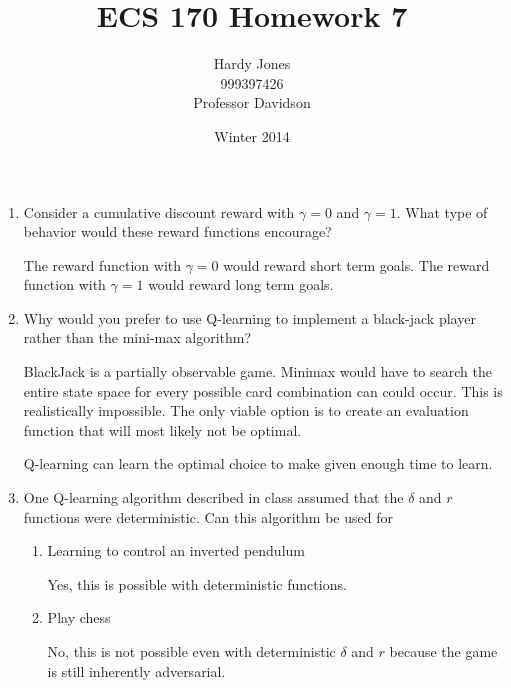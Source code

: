 \documentclass[12pt,letterpaper]{article}
\title{ECS 170 Homework 7\vspace{-2ex}}
\author{Hardy Jones\\
        999397426\\
        Professor Davidson\vspace{-2ex}}
\date{Winter 2014}
\begin{document}
  \maketitle

  \begin{enumerate}
    \item
      Consider a cumulative discount reward with $\gamma = 0$ and $\gamma = 1$.
      What type of behavior would these reward functions encourage?

      The reward function with $\gamma = 0$ would reward short term goals.
      The reward function with $\gamma = 1$ would reward long term goals.

    \item
      Why would you prefer to use Q-learning to implement a black-jack player rather than the mini-max algorithm?

      BlackJack is a partially observable game.
      Minimax would have to search the entire state space for every possible card combination can could occur.
      This is realistically impossible.
      The only viable option is to create an evaluation function that will most likely not be optimal.

      Q-learning can learn the optimal choice to make given enough time to learn.

    \item
      One Q-learning algorithm described in class assumed that the $\delta$ and $r$ functions were deterministic.
      Can this algorithm be used for
        \begin{enumerate}
          \item Learning to control an inverted pendulum

            Yes, this is possible with deterministic functions.
          \item Play chess

            No, this is not possible even with deterministic $\delta$ and $r$ because the game is still inherently adversarial.
         \end{enumerate}


\end{enumerate}
\end{document}

